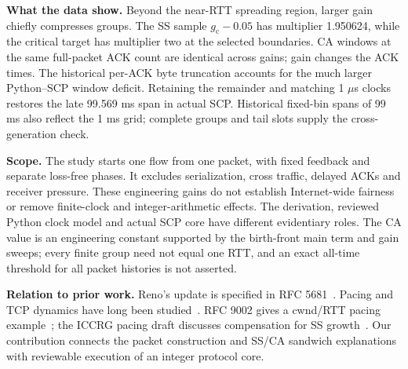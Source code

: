 \documentclass[sigconf,nonacm]{acmart}
\newcommand{\gc}{g_{\mathrm c}}
\begin{document}
\textbf{What the data show.} Beyond the near-RTT spreading region, larger
gain chiefly compresses groups. The SS sample $\gc-0.05$ has multiplier
1.950624, while the critical target has multiplier two at the selected
boundaries. CA windows at the same full-packet ACK count are identical
across gains; gain changes the ACK times. The historical per-ACK byte
truncation accounts for the much larger Python--SCP window deficit.
Retaining the remainder and matching 1 $\mu$s clocks restores the late
99.569 ms span in actual SCP. Historical fixed-bin spans of 99 ms also
reflect the 1 ms grid; complete groups and tail slots supply the
cross-generation check.

\textbf{Scope.} The study starts one flow from one packet, with fixed
feedback and separate loss-free phases. It excludes serialization,
cross traffic, delayed ACKs and receiver pressure. These engineering
gains do not establish Internet-wide fairness or remove finite-clock and
integer-arithmetic effects. The derivation, reviewed Python clock model
and actual SCP core have different evidentiary roles. The CA value is an
engineering constant supported by the birth-front main term and gain
sweeps; every finite group need not equal one RTT, and an exact all-time
threshold for all packet histories is not asserted.

\textbf{Relation to prior work.} Reno's update is specified in RFC
5681~\cite{rfc5681}. Pacing and TCP dynamics have long been studied~\cite{aggarwal}.
RFC 9002 gives a cwnd/RTT pacing example~\cite{rfc9002}; the ICCRG pacing
draft discusses compensation for SS growth~\cite{pacing}. Our contribution
connects the packet construction and SS/CA sandwich explanations with
reviewable execution of an integer protocol core.
\end{document}
